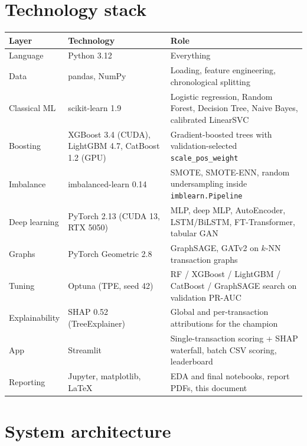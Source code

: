 \documentclass[11pt,a4paper]{article}
\begin{document}
\section{Technology stack}
{\footnotesize
\begin{center}
\begin{tabular}{@{}lP{4.6cm}P{7.2cm}@{}}
\toprule
Layer & Technology & Role \\
\midrule
Language & Python 3.12 & Everything \\
Data & pandas, NumPy & Loading, feature engineering, chronological splitting \\
Classical ML & scikit-learn 1.9 & Logistic regression, Random Forest, Decision Tree, Naive Bayes, calibrated LinearSVC \\
Boosting & XGBoost 3.4 (CUDA), LightGBM 4.7, CatBoost 1.2 (GPU) & Gradient-boosted trees with validation-selected \texttt{scale\_pos\_weight} \\
Imbalance & imbalanced-learn 0.14 & SMOTE, SMOTE-ENN, random undersampling inside \texttt{imblearn.Pipeline} \\
Deep learning & PyTorch 2.13 (CUDA 13, RTX 5050) & MLP, deep MLP, AutoEncoder, LSTM/BiLSTM, FT-Transformer, tabular GAN \\
Graphs & PyTorch Geometric 2.8 & GraphSAGE, GATv2 on $k$-NN transaction graphs \\
Tuning & Optuna (TPE, seed 42) & RF / XGBoost / LightGBM / CatBoost / GraphSAGE search on validation PR-AUC \\
Explainability & SHAP 0.52 (TreeExplainer) & Global and per-transaction attributions for the champion \\
App & Streamlit & Single-transaction scoring + SHAP waterfall, batch CSV scoring, leaderboard \\
Reporting & Jupyter, matplotlib, \LaTeX & EDA and final notebooks, report PDFs, this document \\
\bottomrule
\end{tabular}
\end{center}
}

\section{System architecture}
\end{document}
